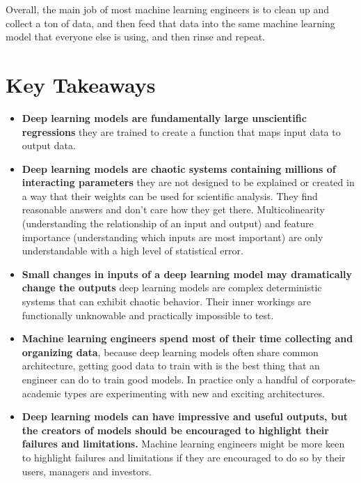 Overall, the main job of most machine learning engineers is to clean up and collect a ton of data, and then feed that data into the same machine learning model that everyone else is using, and then rinse and repeat. 

\section{Key Takeaways}

\begin{itemize}
    \item \textbf{Deep learning models are fundamentally large unscientific regressions} they are trained to create a function that maps input data to output data.
    \item \textbf{Deep learning models are chaotic systems containing millions of interacting parameters} they are not designed to be explained or created in a way that their weights can be used for scientific analysis. They find reasonable answers and don't care how they get there. Multicolinearity (understanding the relationship of an input and output) and feature importance (understanding which inputs are most important) are only understandable with a high level of statistical error.
    \item \textbf{Small changes in inputs of a deep learning model may dramatically change the outputs} deep learning models are complex deterministic systems that can exhibit chaotic behavior. Their inner workings are functionally unknowable and practically impossible to test.
    \item \textbf{Machine learning engineers spend most of their time collecting and organizing data}, because deep learning models often share common architecture, getting good data to train with is the best thing that an engineer can do to train good models. In practice only a handful of corporate-academic types are experimenting with new and exciting architectures. 
    \item \textbf{Deep learning models can have impressive and useful outputs, but the creators of models should be encouraged to highlight their failures and limitations.} Machine learning engineers might be more keen to highlight failures and limitations if they are encouraged to do so by their users, managers and investors.
\end{itemize}

